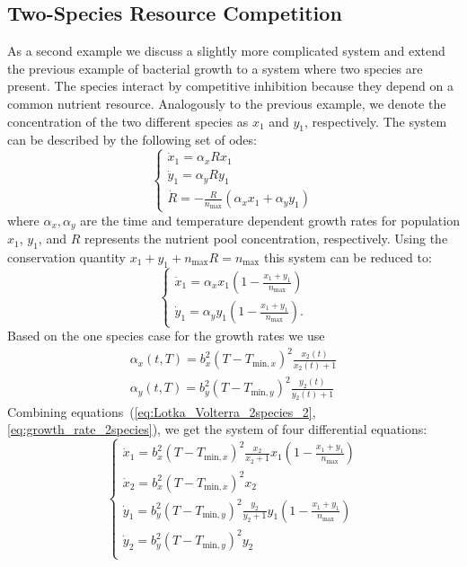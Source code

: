 \documentclass[graybox]{svmult}
\begin{document}
\subsection{Two-Species Resource Competition}
As a second example we discuss a slightly more complicated system and extend the previous example of bacterial growth to a system where two species are present.
The species interact by competitive inhibition because they depend on a common nutrient resource.
Analogously to the previous example, we denote the concentration of the two different species as $x_1$ and $y_1$, respectively.
The system can be described by the following set of \acp{ode}:
\begin{equation}
    \begin{cases}
        \dot x_1 = \alpha_x R x_1 \\
        \dot y_1 = \alpha_y R y_1 \\
        \dot R = -\frac{R}{n_\text{max}}(\alpha_x x_1+\alpha_y y_1)
    \end{cases}
    \label{eq:Lotka_Volterra_2species_1}
\end{equation}
where $\alpha_x, \alpha_y$ are the time and temperature dependent growth rates for population $x_1$, $y_1$, and $R$ represents the nutrient pool concentration, respectively.
Using the conservation quantity $x_1 + y_1 + n_\text{max}R = n_\text{max}$ this system can be reduced to:
\begin{equation}
    \begin{cases}
        \dot x_1 = \alpha_x x_1\left(1-\frac{x_1+y_1}{n_\text{max}}\right) \\
        \dot y_1 = \alpha_y y_1\left(1-\frac{x_1+y_1}{n_\text{max}}\right).
    \end{cases}
    \label{eq:Lotka_Volterra_2species_2}
\end{equation}
Based on the one species case for the growth rates we use~\cite{baranyiDynamicApproach1994,ratkowsky_relationship_1982}
\begin{eqnarray}
    \alpha_x (t, T) = b_x^2 (T - T_{\text{min}, x})^2 \frac{x_2(t)}{x_2(t) + 1}\\
    \alpha_y (t, T) = b_y^2 (T - T_{\text{min}, y})^2 \frac{y_2(t)}{y_2(t) + 1}
    \label{eq:growth_rate_2species}
\end{eqnarray}
Combining equations~(\ref{eq:Lotka_Volterra_2species_2}, \ref{eq:growth_rate_2species}), we get the system of four differential equations:
\begin{equation}
    \begin{cases}
        \dot x_1 = b_x^2 (T - T_{\text{min}, x})^2 \frac{x_2}{x_2 + 1} x_1 (1 - \frac{x_1 + y_1}{n_\text{max}})\\
        \dot x_2 = b_x^2 (T - T_{\text{min}, x})^2 x_2 \\
        \dot y_1 = b_y^2 (T - T_{\text{min}, y})^2 \frac{y_2}{y_2 + 1} y_1 (1 - \frac{x_1 + y_1}{n_\text{max}})\\
        \dot y_2 = b_y^2 (T - T_{\text{min}, y})^2 y_2 \\
    \end{cases}
    \label{eq:model_2species_resource}
\end{equation}
\end{document}
